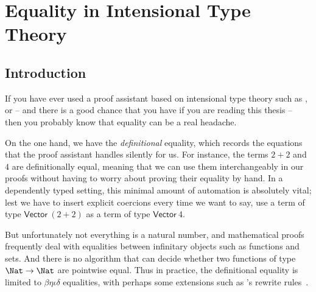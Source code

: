 \setchapterpreamble[u]{\margintoc}
\chapter{Equality in Intensional Type Theory}

\section{Introduction}

If you have ever used a proof assistant based on intensional type theory such as
\Coq, \Agda or {\Lean} -- and there is a good chance that you have if you are 
reading this thesis -- then you probably know that equality can be a real headache.

On the one hand, we have the \emph{definitional} equality, which records the 
equations that the proof assistant handles silently for us.
% 
% 
For instance, the terms \( 2+2 \) and \( 4 \) are definitionally equal, meaning that we 
can use them interchangeably in our proofs without having to worry about 
proving their equality by hand.
% 
In a dependently typed setting, this minimal amount of automation is absolutely vital; 
lest we have to insert explicit coercions every time we want to say, use a term 
of type \( \mathsf{Vector}\ (2+2) \) as a term of type \( \mathsf{Vector}\ 4 \).

But unfortunately not everything is a natural 
number, and mathematical proofs
frequently deal with equalities between infinitary objects such as functions and 
sets.
% 
And there is no algorithm that can decide whether
two functions of type \( \Nat \to \Nat \) are pointwise equal.
% 
Thus in practice, the definitional equality is limited to 
\( \beta \eta \iota \delta \) equalities, with perhaps some extensions
such as \Agda's rewrite rules~.

